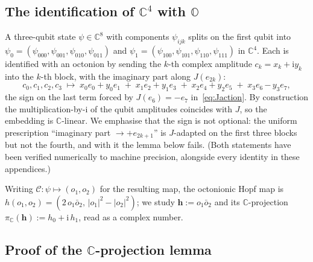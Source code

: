 \subsection{The identification of \texorpdfstring{$\mathbb{C}^4$}{C4} with \texorpdfstring{$\mathbb{O}$}{O}}

A three-qubit state $\psi\in\mathbb{C}^8$ with components $\psi_{ijk}$ splits on the first qubit into
$\psi_0 = (\psi_{000},\psi_{001},\psi_{010},\psi_{011})$ and
$\psi_1 = (\psi_{100},\psi_{101},\psi_{110},\psi_{111})$ in $\mathbb{C}^4$. Each is identified with
an octonion by sending the $k$-th complex amplitude $c_k = x_k + \mathrm{i}y_k$ into the $k$-th
block, with the imaginary part along $J(e_{2k})$:
\begin{equation}
  c_0,c_1,c_2,c_3 \;\longmapsto\;
  x_0e_0 + y_0e_1 \;+\; x_1e_2 + y_1e_3 \;+\; x_2e_4 + y_2e_5 \;+\; x_3e_6 \,\boldsymbol{-}\, y_3e_7,
  \label{eq:embedding}
\end{equation}
the sign on the last term forced by $J(e_6) = -e_7$ in~\eqref{eq:Jaction}. By construction the
multiplication-by-$\mathrm{i}$ of the qubit amplitudes coincides with $J$, so the embedding is
$\mathbb{C}$-linear. We emphasise that the sign is not optional: the uniform prescription
``imaginary part $\to +e_{2k+1}$'' is $J$-adapted on the first three blocks but not the fourth, and
with it the lemma below fails. (Both statements have been verified numerically to machine precision,
alongside every identity in these appendices.)

Writing $\mathcal{C}:\psi\mapsto(o_1,o_2)$ for the resulting map, the octonionic Hopf map is
$h(o_1,o_2) = (2\,o_1\bar o_2,\,|o_1|^2-|o_2|^2)$; we study $\mathbf{h} := o_1\bar o_2$ and its
$\mathbb{C}$-projection $\pi_{\mathbb{C}}(\mathbf{h}) := h_0 + \mathrm{i}\,h_1$, read as a complex
number.

\subsection{Proof of the \texorpdfstring{$\mathbb{C}$}{C}-projection lemma}

